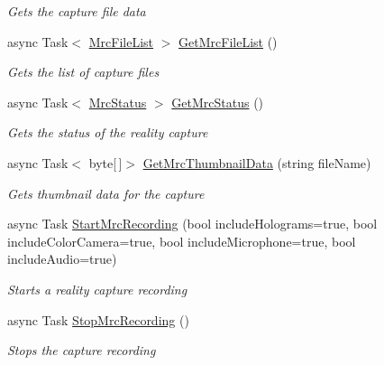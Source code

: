 \begin{DoxyCompactItemize}
\begin{DoxyCompactList}\small\item\em Gets the capture file data \end{DoxyCompactList}\item 
async Task$<$ \hyperlink{class_microsoft_1_1_tools_1_1_windows_device_portal_1_1_device_portal_1_1_mrc_file_list}{Mrc\+File\+List} $>$ \hyperlink{class_microsoft_1_1_tools_1_1_windows_device_portal_1_1_device_portal_a66ff393b0251f39c25717cf7c670159a}{Get\+Mrc\+File\+List} ()
\begin{DoxyCompactList}\small\item\em Gets the list of capture files \end{DoxyCompactList}\item 
async Task$<$ \hyperlink{class_microsoft_1_1_tools_1_1_windows_device_portal_1_1_device_portal_1_1_mrc_status}{Mrc\+Status} $>$ \hyperlink{class_microsoft_1_1_tools_1_1_windows_device_portal_1_1_device_portal_a3c1f4a19743ffbfe36d11904d441d3d1}{Get\+Mrc\+Status} ()
\begin{DoxyCompactList}\small\item\em Gets the status of the reality capture \end{DoxyCompactList}\item 
async Task$<$ byte\mbox{[}$\,$\mbox{]}$>$ \hyperlink{class_microsoft_1_1_tools_1_1_windows_device_portal_1_1_device_portal_a389512b2a8155c38755d9ae383284c3e}{Get\+Mrc\+Thumbnail\+Data} (string file\+Name)
\begin{DoxyCompactList}\small\item\em Gets thumbnail data for the capture \end{DoxyCompactList}\item 
async Task \hyperlink{class_microsoft_1_1_tools_1_1_windows_device_portal_1_1_device_portal_a729ac5891bce472677874e85b947d009}{Start\+Mrc\+Recording} (bool include\+Holograms=true, bool include\+Color\+Camera=true, bool include\+Microphone=true, bool include\+Audio=true)
\begin{DoxyCompactList}\small\item\em Starts a reality capture recording \end{DoxyCompactList}\item 
async Task \hyperlink{class_microsoft_1_1_tools_1_1_windows_device_portal_1_1_device_portal_ac44a7c7330bb399309e3637b49e22cc2}{Stop\+Mrc\+Recording} ()
\begin{DoxyCompactList}\small\item\em Stops the capture recording \end{DoxyCompactList}\item 

\end{DoxyCompactItemize}
